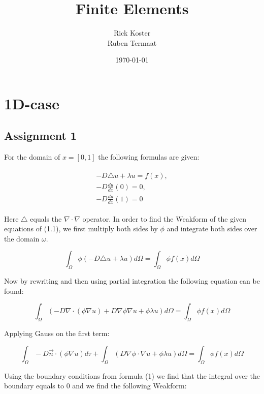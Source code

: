 \documentclass{report}
\title{\Huge Finite Elements}
\author{Rick Koster \\ Ruben Termaat}
\date{\today}
\begin{document}
\maketitle

\tableofcontents


\chapter{1D-case}
\section{Assignment 1}

For the domain of $x = [0,1]  $ the following formulas are given:


\begin{align}
\begin{split}
-D\triangle u + \lambda u = f(x),
\\
-D\frac{du}{dx}(0) = 0 ,
\\
-D\frac{du}{dx}(1) = 0
\end{split}
\end{align}

\vspace{5mm}

Here $ \triangle$ equals the $\nabla \cdot \nabla$ operator. In order to find the Weakform of the given equations of (1.1), we first multiply both sides by $\phi$ and integrate both sides over the domain $\omega$.

\begin{equation}
	 \int_{\Omega} \phi(-D\triangle u + \lambda u )d\Omega = \int_{\Omega} \phi f(x) d\Omega 
\end{equation}	

Now by rewriting and then using partial integration the following equation can be found:

\begin{equation}
 \int_{\Omega} (-D\nabla\cdot(\phi\nabla u) + D\nabla\phi\nabla u +\phi \lambda u) d\Omega = \int_{\Omega} \phi f(x) d\Omega 
\end{equation}

Applying Gauss on the first term:


\begin{equation}
 \int_{\Omega} -D \vec{n}\cdot(\phi \nabla u) d\tau + \int_{\Omega}  (D\nabla\phi\cdot\nabla u +\phi\lambda u )d\Omega = \int_{\Omega} \phi f(x) d\Omega 
\end{equation}

Using the boundary conditions from formula (1) we find that the integral over the boundary equals to 0 and we find the following Weakform:
\end{document}
